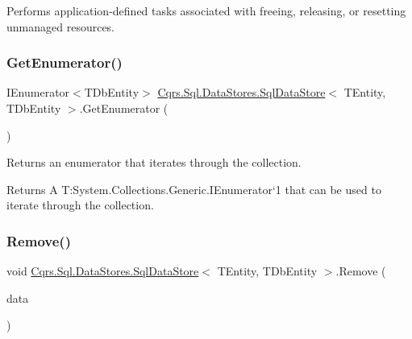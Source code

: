 Performs application-\/defined tasks associated with freeing, releasing, or resetting unmanaged resources. 

\mbox{\label{classCqrs_1_1Sql_1_1DataStores_1_1SqlDataStore_a2114238ed13dfe1beaf1b096d3e36c6a}} 
\subsubsection{\texorpdfstring{Get\+Enumerator()}{GetEnumerator()}}
{\footnotesize\ttfamily I\+Enumerator$<$T\+Db\+Entity$>$ \hyperlink{classCqrs_1_1Sql_1_1DataStores_1_1SqlDataStore}{Cqrs.\+Sql.\+Data\+Stores.\+Sql\+Data\+Store}$<$ T\+Entity, T\+Db\+Entity $>$.Get\+Enumerator (\begin{DoxyParamCaption}{ }\end{DoxyParamCaption})}



Returns an enumerator that iterates through the collection. 

\begin{DoxyReturn}{Returns}
A T\+:\+System.\+Collections.\+Generic.\+I\+Enumerator`1 that can be used to iterate through the collection. 
\end{DoxyReturn}
\mbox{\label{classCqrs_1_1Sql_1_1DataStores_1_1SqlDataStore_ada15bdc873b3e4be8ff9a734d84562fb}} 
\subsubsection{\texorpdfstring{Remove()}{Remove()}}
{\footnotesize\ttfamily void \hyperlink{classCqrs_1_1Sql_1_1DataStores_1_1SqlDataStore}{Cqrs.\+Sql.\+Data\+Stores.\+Sql\+Data\+Store}$<$ T\+Entity, T\+Db\+Entity $>$.Remove (\begin{DoxyParamCaption}\item[{T\+Entity}]{data }\end{DoxyParamCaption})}

